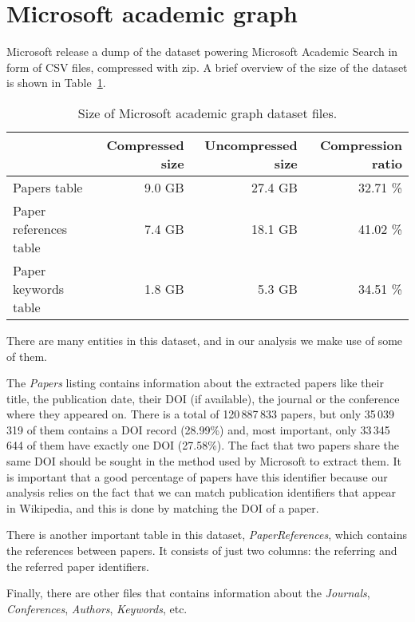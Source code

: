 \section{Microsoft academic graph}
\label{sec:mag_dataset}
Microsoft release a dump of the dataset powering Microsoft Academic Search in form of CSV files, compressed with zip.
A brief overview of the size of the dataset is shown in Table~\ref{tbl:mag_size}.

\begin{table}[h]
\centering
\caption{Size of Microsoft academic graph dataset files.}
\label{tbl:mag_size}
\begin{tabular}{@{}lrrr@{}}
\multicolumn{1}{c}{\textbf{}} & \textbf{Compressed size} & \textbf{Uncompressed size} & \textbf{Compression ratio} \\ \midrule
Papers table                &      9.0 GB &    27.4 GB & 32.71 \% \\
Paper references table      &      7.4 GB &    18.1 GB & 41.02 \% \\
Paper keywords table        &      1.8 GB &     5.3 GB & 34.51 \%
\end{tabular}
\end{table}

There are many entities in this dataset, and in our analysis we make use of some of them.

The \emph{Papers} listing contains information about the extracted papers like their title, the publication date, their \ac{DOI} (if available), the journal or the conference where they appeared on.
There is a total of 120\,887\,833 papers, but only 35\,039\,319 of them contains a \ac{DOI} record (28.99\%) and, most important, only 33\,345\,644 of them have exactly one \ac{DOI} (27.58\%).
The fact that two papers share the same \ac{DOI} should be sought in the method used by Microsoft to extract them.
It is important that a good percentage of papers have this identifier because our analysis relies on the fact that we can match publication identifiers that appear in Wikipedia, and this is done by matching the \ac{DOI} of a paper.

There is another important table in this dataset, \emph{PaperReferences}, which contains the references between papers.
It consists of just two columns: the referring and the referred paper identifiers.

Finally, there are other files that contains information about the \emph{Journals}, \emph{Conferences}, \emph{Authors}, \emph{Keywords}, etc.


